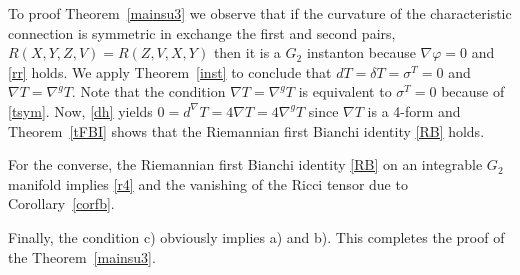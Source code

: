 \documentclass[10pt,british]{article}
\def\sb {{\nabla}}
\def\LC{{\nabla^g}}
\def\p{{\varphi}}
\begin{document}
To   proof Theorem~\ref{mainsu3}  we observe  that if the curvature of the characteristic connection is symmetric in exchange the first and second pairs, $R(X,Y,Z,V)=R(Z,V,X,Y)$ then it is a $G_2$ instanton because $\sb \p=0$ and \eqref{rr} holds. We apply Theorem~\ref{inst} to conclude that $dT=\delta T=\sigma^T=0$ and $\sb T=\LC T$. Note that the condition $\sb T=\LC T$ is equivalent to $\sigma^T=0$ because of  \eqref{tsym}. Now, \eqref{dh} yields $0=d^{\sb}T=4\sb T=4\LC T$  since $\sb T$ is a 4-form and  %
Theorem~\ref{tFBI} shows that the Riemannian first Bianchi identity \eqref{RB} holds.

For the converse, %
the Riemannian first Bianchi identity \eqref{RB} on an integrable $G_2$ manifold implies \eqref{r4} and the vanishing of the Ricci tensor due to Corollary~\ref{corfb}. %

Finally,  the condition c) obviously implies  a) and b). 
This  completes the proof of the Theorem~\ref{mainsu3}.
\end{document}
